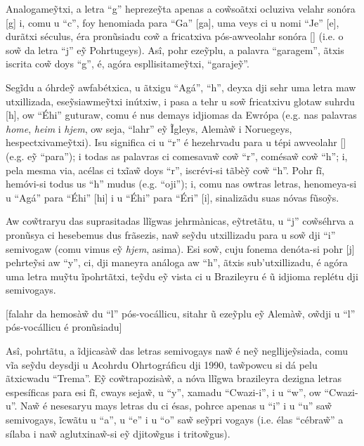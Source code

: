 \documentclass[12pt, a5paper, titlepage]{article}
\begin{document}
\begin{bilingualpages}
    Analogame\~ytxi, a letra ``g'' hepreze\~yta apenas a co\~wsoãtxi ocluziva
    velahr sonóra [g] i, comu u ``c'', foy henomiada para ``Ga'' [ga], uma veys ci
    u nomi ``Je'' [\textyogh e], durãtxi séculus, éra pronũsiadu co\~w a fricatxiva
    pós-awveolahr sonóra [\textyogh] (i.e. o so\~w da letra ``j'' e\~y Pohrtugeys).
    Asî, pohr eze\~yplu, a palavra ``garagem'', ãtxis iscrita co\~w doys ``g'', é,
    agóra espllisitame\~ytxi, ``garaje\~y''.

    Segĩdu a óhrde\~y awfabétxica, u ãtxigu ``Agá'', ``h'', deyxa dji sehr uma
    letra maw utxillizada, ese\~ysiawme\~ytxi inútxiw, i pasa a tehr u so\~w
    fricatxivu glotaw suhrdu [h], ow ``Éhi'' guturaw, comu é nus demays idjiomas da
    Ewrópa (e.g. nas palavras \textit{home}, \textit{heim} i \textit{hjem}, ow
    seja, ``lahr'' e\~y Ĩgleys, Alemà\~w i Noruegeys, hespectxivame\~ytxi). Isu
    significa ci u ``r'' é hezehrvadu para u tépi awveolahr [\textfishhookr] (e.g.
    e\~y ``para''); i todas as palavras ci comesava\~w co\~w ``r'', comésa\~w co\~w
    ``h''; i, pela mesma via, acélas ci txĩa\~w doys ``r'', iscrévi-si tãbè\~y
    co\~w ``h''. Pohr fĩ, hemóvi-si todus us ``h'' mudus (e.g. ``oji''); i, comu
    nas owtras letras, henomeya-si u ``Agá'' para ``Éhi'' [\textepsilon hi] i u
    ``Éhi'' para ``Éri'' [\textepsilon \textfishhookr i], sinalizãdu suas nóvas
    fũso\~ys.

    Aw co\~wtraryu das suprasitadas llĩgwas jehrmànicas, e\~ytretãtu, u ``j''
    co\~wséhrva a pronũsya ci hesebemus dus frãsezis, na\~w se\~ydu utxillizadu
    para u so\~w dji ``i'' semivogaw (comu vimus e\~y \textit{hjem}, asima). Esi
    so\~w, cuju fonema denóta-si pohr [j] pehrte\~ysi aw ``y'', ci, dji maneyra
    análoga aw ``h'', ãtxis sub'utxillizadu, é agóra uma letra mu\~ytu ĩpohrtãtxi,
    te\~ydu e\~y vista ci u Brazileyru é ũ idjioma replétu dji semivogays.

    [falahr da hemosà\~w du ``l'' pós-vocállicu, sitahr ũ eze\~yplu e\~y Alemà\~w, o\~wdji u ``l'' pós-vocállicu é pronũsiadu]

    Asî, pohrtãtu, a ĩdjicasà\~w das letras semivogays na\~w é ne\~y
    negllije\~ysiada, comu vĩa se\~ydu deysdji u Acohrdu Ohrtográficu dji 1990,
    ta\~wpowcu si dá pelu ãtxicwadu ``Trema''. E\~y co\~wtrapozisà\~w, a nóva
    llĩgwa brazileyra dezigna letras espesíficas para esi fĩ, cways seja\~w, u
    ``y'', xamadu ``Cwazi-i'', i u ``w'', ow ``Cwazi-u''. Na\~w é nesesaryu mays
    letras du ci ésas, pohrce apenas u ``i'' i u ``u'' sa\~w semivogays, ĩcwãtu u
    ``a'', u ``e'' i u ``o'' sa\~w se\~ypri vogays (i.e. élas ``cébra\~w'' a sílaba
    i na\~w aglutxina\~w-si e\~y djito\~wgus i trito\~wgus).


\end{bilingualpages}
\end{document}
